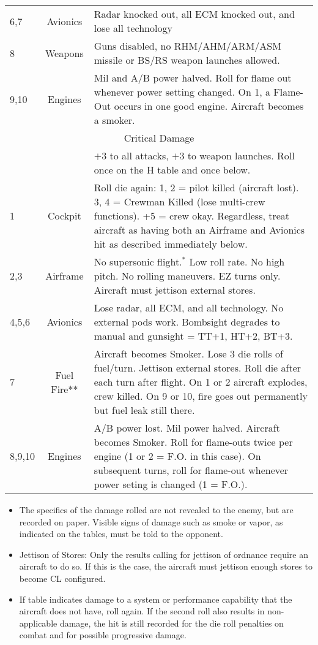 {\begin{twocolumntable}
{\begin{tabularx}{\linewidth}{lcX}
6,7&Avionics&Radar knocked out, all ECM knocked out, and lose all technology\\
8&Weapons&Guns disabled, no RHM/AHM/ARM/ASM missile or BS/RS weapon launches allowed.\\
9,10&Engines&Mil and A/B power halved. Roll for flame out whenever power setting changed. On 1, a Flame-Out occurs in one good engine. Aircraft becomes a smoker.\\
\midrule
\multicolumn{3}{c}{Critical Damage}\\
\midrule
&&$+3$ to all attacks, $+3$ to weapon launches. Roll once on the H table and once below.\\
1&Cockpit&Roll die again: 1, 2 = pilot killed (aircraft lost). 3, 4 = Crewman Killed (lose multi-crew functions). +5 = crew okay. Regardless, treat aircraft as having both an Airframe and Avionics hit as described immediately below.\\
2,3&Airframe&
No supersonic flight.$^*$ Low roll rate. No high pitch. No rolling maneuvers. EZ turns only. Aircraft must jettison external stores.\\
4,5,6&Avionics&Lose radar, all ECM, and all technology. No external pods work. Bombsight degrades to manual and gunsight = TT+1, HT+2, BT+3.\\
7&Fuel Fire**&Aircraft becomes Smoker. Lose 3 die rolls of fuel/turn. Jettison external stores. Roll die after each turn after flight. On 1 or 2 aircraft explodes, crew killed. On 9 or 10, fire goes out permanently but fuel leak still there.\\
8,9,10&Engines&A/B power lost. Mil power halved. Aircraft becomes Smoker. Roll for flame-outs twice per engine (1 or 2 = F.O. in this case). On subsequent turns, roll for flame-out whenever power seting is changed (1 = F.O.).\\
\bottomrule
\end{tabularx}
\begin{tablenote}{\linewidth}
\begin{itemize}
    \item The specifics of the damage rolled are not revealed to the enemy, but are recorded on paper. Visible signs of damage such as smoke or vapor, as indicated on the tables, must be told to the opponent.
    \item Jettison of Stores: Only the results calling for jettison of ordnance require an aircraft to do so. If this is the case, the aircraft must jettison enough stores to become CL configured. 
    \item If table indicates damage to a system or performance capability that the aircraft does not have, roll again. If the second roll also results in non-applicable damage, the hit is still recorded for the die roll penalties on combat and for possible progressive damage.

\end{itemize}
\end{tablenote}}
\end{twocolumntable}}

